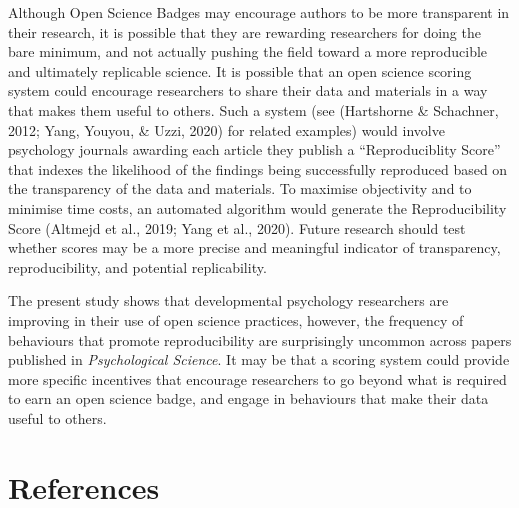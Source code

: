 \documentclass[
  english,
  man,floatsintext]{apa6}
\begin{document}
Although Open Science Badges may encourage authors to be more transparent in their research, it is possible that they are rewarding researchers for doing the bare minimum, and not actually pushing the field toward a more reproducible and ultimately replicable science. It is possible that an open science scoring system could encourage researchers to share their data and materials in a way that makes them useful to others. Such a system (see (Hartshorne \& Schachner, 2012; Yang, Youyou, \& Uzzi, 2020) for related examples) would involve psychology journals awarding each article they publish a ``Reproduciblity Score'' that indexes the likelihood of the findings being successfully reproduced based on the transparency of the data and materials. To maximise objectivity and to minimise time costs, an automated algorithm would generate the Reproducibility Score (Altmejd et al., 2019; Yang et al., 2020). Future research should test whether scores may be a more precise and meaningful indicator of transparency, reproducibility, and potential replicability.

The present study shows that developmental psychology researchers are improving in their use of open science practices, however, the frequency of behaviours that promote reproducibility are surprisingly uncommon across papers published in \emph{Psychological Science}. It may be that a scoring system could provide more specific incentives that encourage researchers to go beyond what is required to earn an open science badge, and engage in behaviours that make their data useful to others.

\newpage

\hypertarget{references}{%
\section{References}\label{references}}

\begingroup
\setlength{\parindent}{-0.5in}
\setlength{\leftskip}{0.5in}
\end{document}
